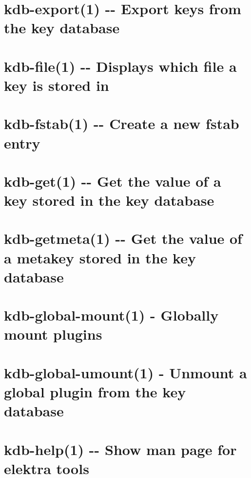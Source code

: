 \documentclass[twoside]{book}
\newcommand{\+}{\discretionary{\mbox{\scriptsize$\hookleftarrow$}}{}{}}
\begin{document}
\chapter{kdb-\/export(1) -\/-\/ Export keys from the key database}
\label{md_doc_help_kdb-export}

\chapter{kdb-\/file(1) -\/-\/ Displays which file a key is stored in}
\label{md_doc_help_kdb-file}

\chapter{kdb-\/fstab(1) -\/-\/ Create a new fstab entry}
\label{md_doc_help_kdb-fstab}

\chapter{kdb-\/get(1) -\/-\/ Get the value of a key stored in the key database}
\label{md_doc_help_kdb-get}

\chapter{kdb-\/getmeta(1) -\/-\/ Get the value of a metakey stored in the key database}
\label{md_doc_help_kdb-getmeta}

\chapter{kdb-\/global-\/mount(1) -\/ Globally mount plugins}
\label{md_doc_help_kdb-global-mount}

\chapter{kdb-\/global-\/umount(1) -\/ Unmount a global plugin from the key database}
\label{md_doc_help_kdb-global-umount}

\chapter{kdb-\/help(1) -\/-\/ Show man page for elektra tools}
\label{md_doc_help_kdb-help}

\end{document}
